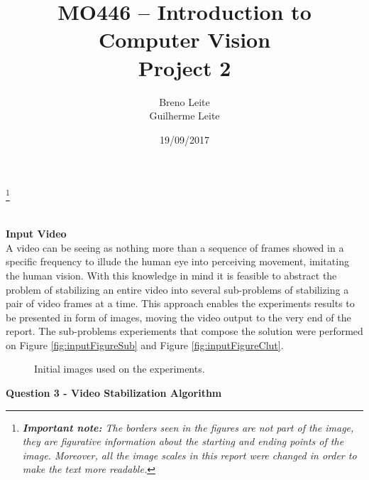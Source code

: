 \documentclass[12pt,a4paper]{article}
\title{MO446 -- Introduction to Computer Vision  \\ Project 2}
\author{Breno Leite  \\ Guilherme Leite}
\date{19/09/2017}
\newcommand\blfootnote[1]{%
	\begingroup
	\renewcommand\thefootnote{}\footnote{#1}%
	\addtocounter{footnote}{-1}%
	\endgroup
}
\begin{document}
\maketitle
\blfootnote{\textit{\textbf{Important note:} The borders seen in the figures are not part of the image, they are figurative information about the starting and ending points of the image. Moreover, all the image scales in this report were changed in order to make the text more readable.}} \\


\textbf{\LARGE Input Video}\\

A video can be seeing as nothing more than a sequence of frames showed in a specific frequency to illude the human eye into perceiving movement, imitating the human vision. With this knowledge in mind it is feasible to abstract the problem of stabilizing an entire video into several sub-problems of stabilizing a pair of video frames at a time. This approach enables the experiments results to be presented in form of images, moving the video output to the very end of the report. The sub-problems experiements that compose the solution were performed on Figure \ref{fig:inputFigureSub} and Figure \ref{fig:inputFigureClut}. \\

\begin{figure}[!h]
	\centering
	\quad
	\caption{Initial images used on the experiments.}
	\label{fig:inputFigure}
\end{figure}

\textbf{\LARGE Question 3 - Video Stabilization Algorithm}\\
\end{document}

